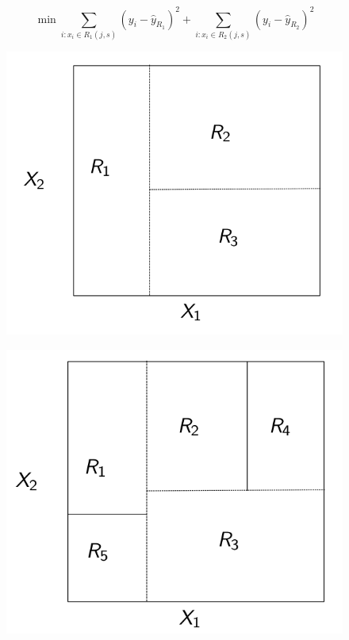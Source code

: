 \documentclass{beamer}
\theoremstyle{definition}
\begin{document}
\begin{frame}
\[ \min \sum_{i\colon x_i \in R_1(j,s)} (y_i - \widehat{y}_{R_1})^2 + \sum_{i\colon x_i \in R_2(j,s)} (y_i - \widehat{y}_{R_2})^2 \]
\end{frame}

\begin{frame}
\begin{figure}[h!]
%
\includegraphics[scale=0.3]{svg-inkscape/dibujo3.png}
\end{figure}
\end{frame}


\begin{frame}
\begin{figure}[h!]
\includegraphics[scale=0.3]{svg-inkscape/dibujo4.png}
\end{figure}
\end{frame}
\end{document}
